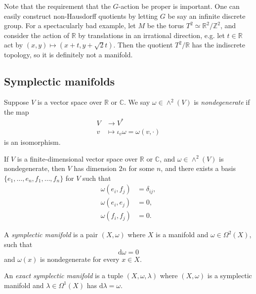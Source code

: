 \documentclass[12pt,letterpaper,reqno]{article}
\numberwithin{equation}{section}
\newcommand{\R}{\ensuremath{\mathbb R}}
\newcommand{\C}{\ensuremath{\mathbb C}}
\newcommand{\Z}{\ensuremath{\mathbb Z}}
\newcommand{\de}{\mathrm{d}}
\newcommand{\ti}[1]{\textit{#1}}
\begin{document}
Note that the requirement that the $G$-action be proper is
important. One
can easily construct non-Hausdorff quotients by letting $G$ be say
an infinite discrete group.
For a spectacularly bad example,
let $M$ be the torus $T^2 \simeq \R^2 / \Z^2$, and consider
the action of $\R$ by translations in an irrational direction,
e.g. let $t \in \R$ act by $(x,y) \mapsto (x+t,y+\sqrt{2}t)$.
Then the quotient $T^2 / \R$ has the indiscrete topology,
so it is definitely not a manifold.


\subsection{Symplectic manifolds}

\begin{defn} \label{def:nondegenerate-skew-pairing}
Suppose $V$ is a vector space over $\R$ or $\C$.
We say $\omega \in \wedge^2(V)$ is \ti{nondegenerate}
if the map
\begin{align}
  V &\to V^* \\
  v &\mapsto \iota_v \omega = \omega(v,\cdot)
\end{align}
is an isomorphism.
\end{defn}

\begin{prop}
\label{prop:standard-nondegenerate-skew-pairing}
If $V$ is a finite-dimensional vector space over $\R$ or $\C$, and
$\omega \in \wedge^2(V)$ is nondegenerate, then $V$ has
dimension $2n$ for some $n$, and there
exists a basis $\{e_1, \dots, e_n, f_1, \dots, f_n\}$ for $V$
such that
\begin{align}
\omega(e_i, f_j) &= \delta_{ij}, \\
\omega(e_i, e_j) &= 0, \\
\omega(f_i, f_j) &= 0.
\end{align}
\end{prop}

\begin{defn} \label{def:symplectic-manifold}
A \ti{symplectic manifold} is a pair $(X,\omega)$
where $X$ is a manifold and
$\omega \in \Omega^2(X)$, such that
\begin{equation}
  \de \omega = 0
\end{equation}
and $\omega(x)$ is nondegenerate for every $x \in X$.
\end{defn}

\begin{defn}
An \ti{exact symplectic manifold} is a tuple $(X,\omega,\lambda)$
where $(X,\omega)$ is a symplectic manifold and $\lambda \in \Omega^1(X)$ has $\de \lambda = \omega$.
\end{defn}
\end{document}
